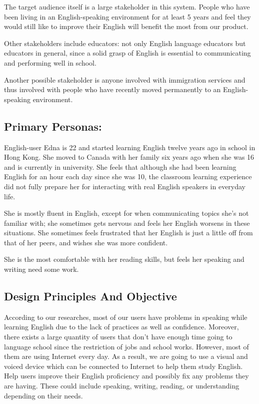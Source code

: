 \documentclass{sigchi}
\begin{document}
The target audience itself is a large stakeholder in this system. People who have been living in an English-speaking environment for at least 5 years and feel they would still like to improve their English will benefit the most from our product.

Other stakeholders include educators: not only English language educators but educators in general, since a solid grasp of English is essential to communicating and performing well in school.

Another possible stakeholder is anyone involved with immigration services and thus involved with people who have recently moved permanently to an English-speaking environment.




\subsection{Primary Personas:}
English-user Edna is 22 and started learning English twelve years ago in school in Hong Kong. She moved to Canada with her family six years ago when she was 16 and is currently in university. She feels that although she had been learning English for an hour each day since she was 10, the classroom learning experience did not fully prepare her for interacting with real English speakers in everyday life.

She is mostly fluent in English, except for when communicating topics she’s not familiar with; she sometimes gets nervous and feels her English worsens in these situations. She sometimes feels frustrated that her English is just a little off from that of her peers, and wishes she was more confident.

She is the most comfortable with her reading skills, but feels her speaking and writing need some work.

\subsection{Design Principles And Objective}
According to our researches, most of our users have problems in speaking while learning English due to the lack of practices as well as confidence. Moreover, there exists a large quantity of users that don’t have enough time going to language school since the restriction of jobs and school works. However, most of them are using Internet every day. As a result, we are going to use a visual and voiced device which can be connected to Internet to help them study English. Help users improve their English proficiency and possibly fix any problems they are having. These could include speaking, writing, reading, or understanding depending on their needs.
\end{document}
